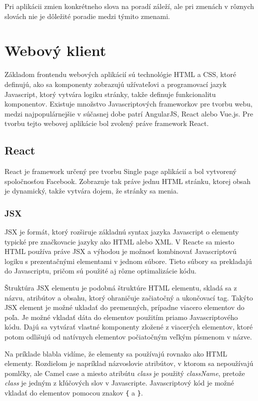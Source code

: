 \documentclass[
  digital, %
  table,   %
  lof,     %
  lot,     %
]{fithesis3}
\begin{document}
Pri aplikácii zmien konkrétneho slova na poradí záleží, ale pri zmenách v rôznych slovách nie je dôležité poradie medzi týmito zmenami.





\chapter{Webový klient}
Základom frontendu webových aplikácií sú technológie HTML a CSS, ktoré definujú, ako sa komponenty zobrazujú užívateľovi a programovací jazyk Javascript, ktorý vytvára logiku stránky, takže definuje funkcionalitu komponentov. Existuje množstvo Javascriptových frameworkov pre tvorbu webu, medzi najpopulárnejšie v súčasnej dobe patrí AngularJS, React alebo Vue.js. Pre tvorbu tejto webovej aplikácie bol zvolený práve framework React.

\section{React}
React je framework určený pre tvorbu Single page aplikácií a bol vytvorený spoločnosťou Facebook. Zobrazuje tak práve jednu HTML stránku, ktorej obsah je dynamický, takže vytvára dojem, že stránky sa menia.

\subsection{JSX}
JSX je formát, ktorý rozširuje základnú syntax jazyka Javascript o elementy typické pre značkovacie jazyky ako HTML alebo XML. V Reacte sa miesto HTML používa práve JSX a výhodou je možnosť kombinovať Javascriptovú logiku s prezentačnými elementami v jednom súbore. Tieto súbory sa prekladajú do Javascriptu, pričom sú použité aj rôzne optimalizácie kódu.

Štruktúra JSX elementu je podobná štruktúre HTML elementu, skladá sa z názvu, atribútov a obsahu, ktorý ohraničuje začiatočný a ukončovací tag. Takýto JSX element je možné ukladať do premenných, prípadne viacero elementov do poľa. Je možné vkladať dáta do elementov použitím priamo Javascriptového kódu. Dajú sa vytvárať vlastné komponenty zložené z viacerých elementov, ktoré potom odlišujú od natívnych elementov počiatočným veľkým písmenom v názve.

Na príklade blabla vidíme, že elementy sa používajú rovnako ako HTML elementy. Rozdielom je napríklad názvoslovie atribútov, v ktorom sa nepoužívajú pomlčky, ale Camel case a miesto atribútu \textit{class} je použitý \textit{className}, pretože \textit{class} je jedným z kľúčových slov v Javascripte. Javascriptový kód je možné vkladať do elementov pomocou znakov \texttt{\{} a \texttt{\}}.
\end{document}
